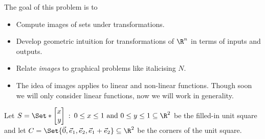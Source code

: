 	\question
	\begin{annotation}
		\begin{goals}

			The goal of this problem is to
			\begin{itemize}
				\item Compute images of sets under transformations.
				\item Develop geometric intuition for transformations of $\R^n$
					in terms of inputs and outputs.
				\item Relate \emph{images} to graphical problems like italicising $N$.
			\end{itemize}
		\end{goals}

		\begin{notes}
			\begin{itemize}
				\item The idea of images applies to linear and non-linear functions.
					Though soon we will only consider linear functions, now
					we will work in generality.
			\end{itemize}
		\end{notes}
	\end{annotation}
	Let $S=\Set*{\mat{x\\y} \given 0\leq x\leq 1\text{ and } 0\leq y\leq 1}\subseteq \R^2$ be the filled-in unit
	square and let $C=\Set{\vec 0, \xhat,\yhat,\xhat+\yhat}\subseteq \R^2$
	be the corners of the unit square.
